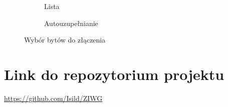 \documentclass[12pt,a4paper]{article} %
\begin{document}
    
    \begin{figure}[h!]
    \centering
    \begin{subfigure}{.45\textwidth}
      \centering
      \caption{Lista}
    \end{subfigure}
    \begin{subfigure}{.45\textwidth}
      \centering
      \caption{Autouzupełnianie}
    \end{subfigure}
    \caption{Wybór bytów do złączenia}
    \label{fig:input}
    \end{figure}
\newpage
\section{Link do repozytorium projektu}
    \url{https://github.com/Isild/ZIWG}
\end{document}
